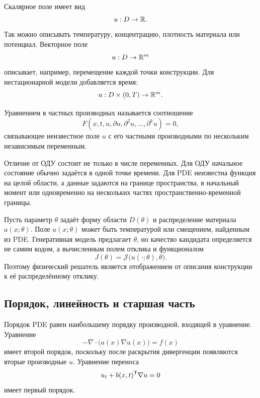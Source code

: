 Скалярное поле имеет вид
\[
u:D\to\mathbb{R}.
\]
Так можно описывать температуру, концентрацию, плотность материала или потенциал. Векторное поле
\[
u:D\to\mathbb{R}^m
\]
описывает, например, перемещение каждой точки конструкции. Для нестационарной модели добавляется время:
\[
u:D\times(0,T)\to\mathbb{R}^m.
\]

\begin{definition}
Уравнением в частных производных называется соотношение
\begin{equation}
\label{eq:general-pde-v01}
F\!\left(
 x,t,u,\partial u,\partial^2u,\ldots,\partial^k u
\right)=0,
\end{equation}
связывающее неизвестное поле $u$ с его частными производными по нескольким независимым переменным.
\end{definition}

Отличие от ОДУ состоит не только в числе переменных. Для ОДУ начальное состояние обычно задаётся в одной точке времени. Для PDE неизвестна функция на целой области, а данные задаются на границе пространства, в начальный момент или одновременно на нескольких частях пространственно-временной границы.

\begin{application}
Пусть параметр $\theta$ задаёт форму области $D(\theta)$ и распределение материала $a(x;\theta)$. Поле $u(x;\theta)$ может быть температурой или смещением, найденным из PDE. Генеративная модель предлагает $\theta$, но качество кандидата определяется не самим кодом, а вычисленным полем отклика и функционалом
\begin{equation}
\label{eq:pde-design-objective-preview-v01}
J(\theta)=\mathcal J\bigl(u(\cdot;\theta),\theta\bigr).
\end{equation}
Поэтому физический решатель является отображением от описания конструкции к её распределённому отклику.
\end{application}

\subsection{Порядок, линейность и старшая часть}

Порядок PDE равен наибольшему порядку производной, входящей в уравнение. Уравнение
\[
-\nabla\cdot\bigl(a(x)\nabla u(x)\bigr)=f(x)
\]
имеет второй порядок, поскольку после раскрытия дивергенции появляются вторые производные $u$. Уравнение переноса
\[
u_t+b(x,t)^{\mathsf{T}}\nabla u=0
\]
имеет первый порядок.

